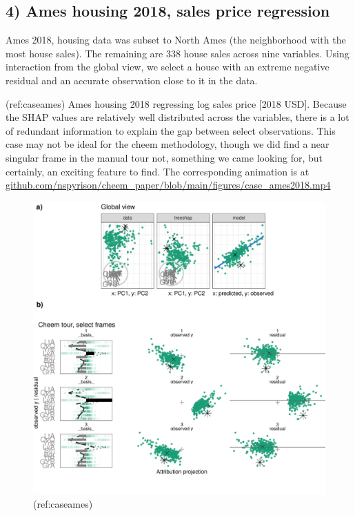 \documentclass[
]{article}
\begin{document}
\hypertarget{ames-housing-2018-sales-price-regression}{%
\subsection{4) Ames housing 2018, sales price
regression}\label{ames-housing-2018-sales-price-regression}}

Ames 2018, housing data was subset to North Ames (the neighborhood with
the most house sales). The remaining are 338 house sales across nine
variables. Using interaction from the global view, we select a house
with an extreme negative residual and an accurate observation close to
it in the data.

(ref:caseames) Ames housing 2018 regressing log sales price {[}2018
USD{]}. Because the SHAP values are relatively well distributed across
the variables, there is a lot of redundant information to explain the
gap between select observations. This case may not be ideal for the
cheem methodology, though we did find a near singular frame in the
manual tour not, something we came looking for, but certainly, an
exciting feature to find. The corresponding animation is at
\href{https://github.com/nspyrison/cheem_paper/blob/main/figures/case_ames2018.mp4}{github.com/nspyrison/cheem\_paper/blob/main/figures/case\_ames2018.mp4}

\begin{figure}

{\centering \includegraphics[width=1\linewidth]{./figures/case_ames2018} 

}

\caption{(ref:caseames)}\label{fig:caseames}
\end{figure}
\end{document}

